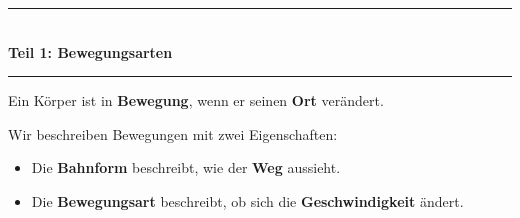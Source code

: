 \documentclass[11pt, a4paper]{article}
\newcommand{\seitentitel}[1]{%
    \noindent\textcolor{physik}{\rule{\textwidth}{2pt}}\\[0.3em]
    {\LARGE\bfseries\textcolor{physik}{#1}}\\[0.2em]
    \textcolor{physik}{\rule{\textwidth}{0.5pt}}
    \vspace{0.5em}
}
\begin{document}

\seitentitel{Teil 1: Bewegungsarten}

\begin{merkkasten}
Ein Körper ist in \textbf{Bewegung}, wenn er seinen \textbf{Ort} verändert.

Wir beschreiben Bewegungen mit zwei Eigenschaften:
\begin{itemize}[leftmargin=1.5em, itemsep=1pt]
    \item Die \textbf{Bahnform} beschreibt, wie der \textbf{Weg} aussieht.
    \item Die \textbf{Bewegungsart} beschreibt, ob sich die \textbf{Geschwindigkeit} ändert.
\end{itemize}
\end{merkkasten}

\vspace{0.3em}
\end{document}
